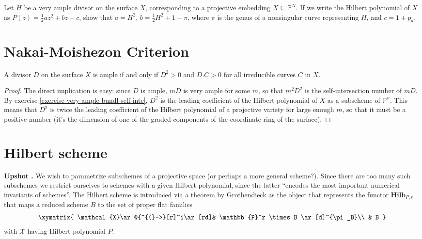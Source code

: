 \documentclass{book}
\begin{document}
\begin{exercise}
\label{exercise-very-ample-bundl-self-inte}
\begin{reference}
\cite[V, Exercise 1.2]{har}
\end{reference}
Let $H$ be a very ample divisor on the
surface $X$, corresponding to a
projective embedding
$X\subseteq\mathbb{P}^N$. If we write the
Hilbert
polynomial of $X$ as
$P(z)=\frac{1}{2}az^2+bz+c$, show that
$a=H^2$,
$b=\frac{1}{2}H^2+1-\pi$, where $\pi$ is the
genus of a nonsingular curve
representing $H$, and $c=1+p_a$.
\end{exercise}

\section{Nakai-Moishezon Criterion}
\label{section-Nakai-Moishezon-criterion}

\begin{theorem}
\label{theorem-Nakai-Moishezon-criterion}
\begin{reference}
\cite[V, Theorem 1.10]{hart}
\end{reference}
A divisor $D$ on the surface $X$ is ample if
and only if $D^2>0$ and $D.C>0$ for
all irreducible curves $C$ in $X$.
\end{theorem}

\begin{proof}
The direct implication is easy: since $D$ is
ample,  $mD$ is very ample for some
$m$, so that $m^2D^2$ is the
self-intersection number of $mD$. By exercise
\ref{exercise-very-ample-bundl-self-inte},
 $D^2$ is the leading coefficient of the
 Hilbert polynomial of $X$ as a
subscheme of $\mathbb{P}^n$. This means that
$D^2$ is twice the leading
coefficient of the Hilbert polynomial of a
projective variety for large enough
$m$, so that it must be a positive number
(it's the dimension of one of the
graded components of the coordinate ring of
the surface).
\end{proof}

\section{Hilbert scheme}
\label{section-Hilbert-scheme}

{\bf Upshot \cite[p. 6]{HarrMorr}.}
We wish to parametrize subschemes of a
projective space (or
perhaps a more general scheme?). Since there
are too many such subschemes we
restrict ourselves to schemes with a given
Hilbert polynomial, since the latter
``encodes the most important numerical
invariants of schemes''. The Hilbert
scheme is introduced via a theorem by
Grothendieck
as the object that represents the functor
$\mathbf{Hilb}_{P,r}$
that maps a reduced scheme $B$ to the
set of proper flat families
$$
\xymatrix{
\mathcal{X}\ar@{^{(}->}[r]^i\ar[rd]&
\mathbb{P}^r
\times B \ar[d]^{\pi_B}\\
& B
}
$$
with $\mathcal{X}$ having Hilbert polynomial
$P$.
\end{document}
